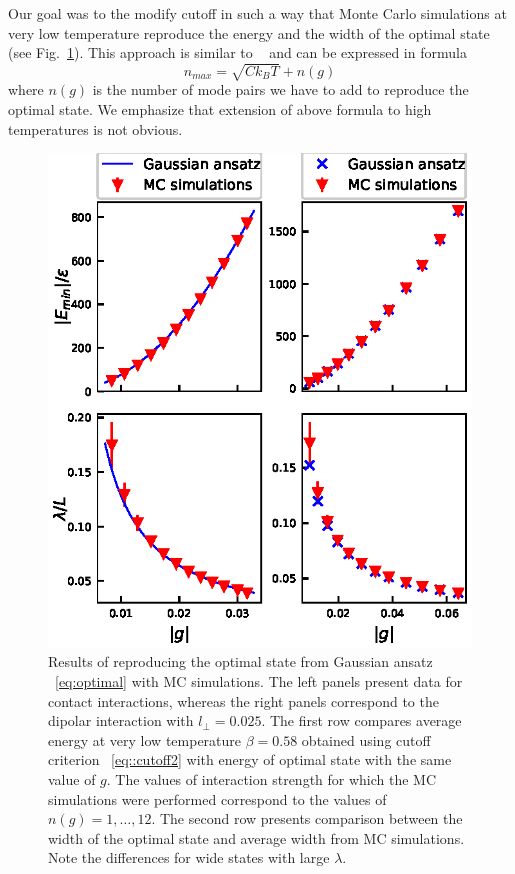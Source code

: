 \documentclass[aps,pra,reprint]{revtex4-2}
\begin{document}
Our goal was to the modify cutoff in such a way that Monte Carlo simulations at 
very low temperature reproduce the energy and the width of the optimal state 
(see Fig.~\ref{fig:reproducing}). This approach is similar to
~\cite{Bienias2011c} and can be expressed in formula
\begin{equation}
\label{eq::cutoff2}
n_{max} = \sqrt{C k_{\textit{B}} T} + n(g)
\end{equation}
where $n(g)$ is the number of mode pairs we have to add to reproduce the 
optimal state. We emphasize that extension of above formula to high 
temperatures is not obvious.
\begin{figure}
\includegraphics{fig4.eps}
\caption{Results of reproducing the optimal state from Gaussian ansatz
~\eqref{eq:optimal} with MC simulations. The left panels present data for 
contact interactions, whereas the right panels correspond to the dipolar 
interaction with $l_{\perp}=0.025$. The first row compares average energy at 
very low temperature $\beta=0.58$ obtained using cutoff criterion
~\eqref{eq::cutoff2} with energy of optimal state with the same value of $g$. 
The values of interaction strength for which the MC simulations were performed 
correspond to the values of $n(g)=1, \ldots , 12$. The second row presents 
comparison between the width of the optimal state and average width from MC 
simulations. Note the differences for wide states with large $\lambda$.}
\label{fig:reproducing}
\end{figure}
\end{document}
